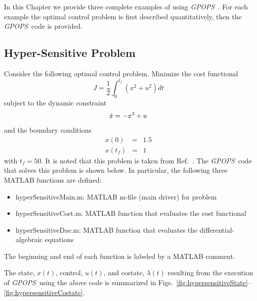 \documentclass[10pt]{article}
\newcommand{\gpops}{{\em GPOPS}~}
\newenvironment{shadedframe}{%
  \def\FrameCommand{\fcolorbox{black}{shadecolor}}%
  \MakeFramed {\FrameRestore}}
{\endMakeFramed}
\begin{document}
In this Chapter we provide three complete examples of using \gpops.  For
each example the optimal control problem is first described quantitatively,
then the \gpops code is provided.

\subsection{Hyper-Sensitive Problem}

\vspace{12pt}

Consider the following optimal control problem.  Minimize the cost functional
\begin{equation}
  J = \textstyle\frac{1}{2}\displaystyle \int_0^{t_f} \left( x^2 + u^2 \right) dt
\end{equation}
subject to the dynamic constraint
\begin{equation}
  \dot{x} = -x^3 + u
\end{equation}
and the boundary conditions
\begin{equation}
  \begin{array}{lcl}
    x(0) & = & 1.5 \\
    x(t_f) & = & 1
  \end{array}
\end{equation}
with $t_f=50$.  It is noted that this problem is taken from Ref.~.  The \gpops code that solves this problem
is shown below.  In particular, the following three MATLAB functions
are defined:
\begin{itemize}
  \item hyperSensitiveMain.m: MATLAB m-file (main driver) for problem
  \item hyperSensitiveCost.m: MATLAB function that evaluates the cost functional
  \item hyperSensitiveDae.m:  MATLAB function that evaluates the differential-algebraic equations
\end{itemize}
The beginning and end of each function is labeled by a MATLAB comment.
\scriptsize
\begin{shadedframe}



\end{shadedframe}
\normalsize 
The state, $x(t)$, control, $u(t)$, and costate, $\lambda(t)$
resulting from the execution of \gpops using the above code is
summarized in
Figs.~\ref{fig:hypersensitiveState}--\ref{fig:hypersensitiveCostate}.  
\end{document}
